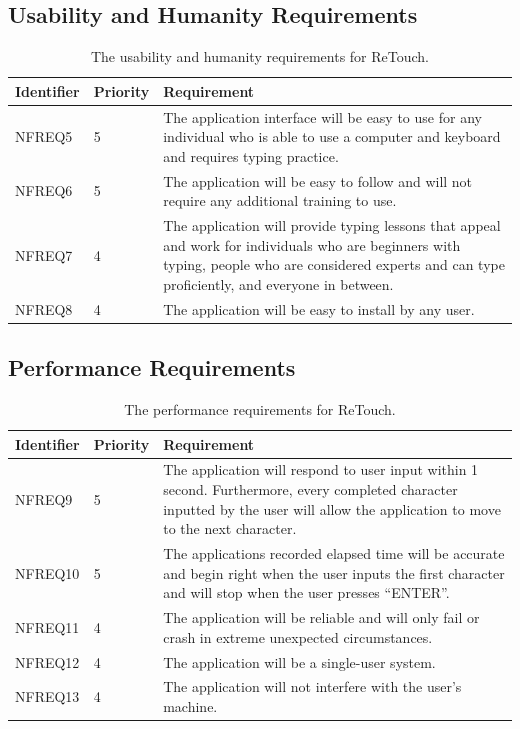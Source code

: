 \documentclass[12pt, titlepage]{article}
\begin{document}
\subsection{Usability and Humanity Requirements}

\begin{table}[H]
  \caption{The usability and humanity requirements for ReTouch.}
\begin{tabular}{ |m{2cm}|m{1.8cm}|m{9.4cm}| }
    \hline
    \textbf{Identifier} & \textbf{Priority} & \textbf{Requirement} \\ 
    \hline
    NFREQ5 & 5 & The application interface will be easy to use for any individual who is able to use a computer and keyboard and requires typing practice. \\
    \hline
    NFREQ6 & 5 & The application will be easy to follow and will not require any additional training to use. \\ 
    \hline
    NFREQ7 & 4 & The application will provide typing lessons that appeal and work for individuals who are beginners with typing, people who are considered experts and can type proficiently, and everyone in between. \\
    \hline
    NFREQ8 & 4 & The application will be easy to install by any user. \\
    \hline
\end{tabular}
\end{table}

\subsection{Performance Requirements}

\begin{table}[H]
  \caption{The performance requirements for ReTouch.}
\begin{tabular}{ |m{2cm}|m{1.8cm}|m{9.4cm}| }
    \hline
    \textbf{Identifier} & \textbf{Priority} & \textbf{Requirement} \\ 
    \hline
    NFREQ9 & 5 & The application will respond to user input within 1 second. Furthermore, every completed character inputted by the user will allow the application to move to the next character. \\
    \hline
    NFREQ10 & 5 & The applications recorded elapsed time will be accurate and begin right when the user inputs the first character and will stop when the user presses “ENTER”. \\ 
    \hline
    NFREQ11 & 4 & The application will be reliable and will only fail or crash in extreme unexpected circumstances. \\
    \hline
    NFREQ12 & 4 & The application will be a single-user system. \\
    \hline
    NFREQ13 & 4 & The application will not interfere with the user's machine. \\
    \hline
\end{tabular}
\end{table}
\end{document}
